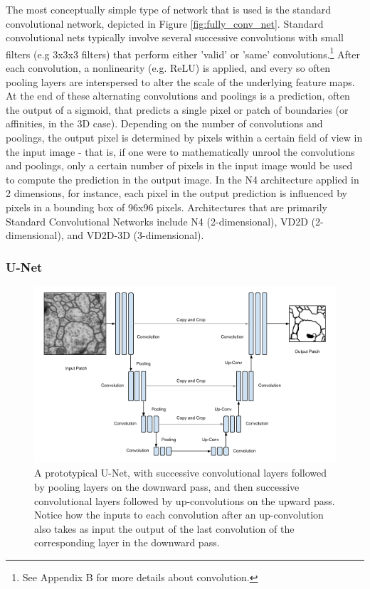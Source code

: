 The most conceptually simple type of network that is used is the standard convolutional network, depicted in Figure \ref{fig:fully_conv_net}. Standard convolutional nets typically involve several successive convolutions with small filters (e.g 3x3x3 filters) that perform either 'valid' or 'same' convolutions.\footnote{See Appendix B for more details about convolution.} After each convolution, a nonlinearity (e.g. ReLU) is applied, and every so often pooling layers are interspersed to alter the scale of the underlying feature maps. At the end of these alternating convolutions and poolings is a prediction, often the output of a sigmoid, that predicts a single pixel or patch of boundaries (or affinities, in the 3D case). Depending on the number of convolutions and poolings, the output pixel is determined by pixels within a certain field of view in the input image - that is, if one were to mathematically unrool the convolutions and poolings, only a certain number of pixels in the input image would be used to compute the prediction in the output image. In the N4 architecture applied in 2 dimensions, for instance, each pixel in the output prediction is influenced by pixels in a bounding box of 96x96 pixels. Architectures that are primarily Standard Convolutional Networks include N4 (2-dimensional), VD2D (2-dimensional), and VD2D-3D (3-dimensional).

\subsubsection{U-Net}

\begin{figure}
\centering
\includegraphics[width=\textwidth]{img/U_Net.png}
\caption[A prototypical U-Net]{A prototypical U-Net, with successive convolutional layers followed by pooling layers on the downward pass, and then successive convolutional layers followed by up-convolutions on the upward pass. Notice how the inputs to each convolution after an up-convolution also takes as input the output of the last convolution of the corresponding layer in the downward pass.}
\label{fig:u_net}
\end{figure}

